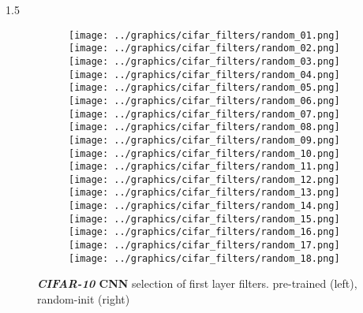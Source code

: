 \documentclass[final]{beamer}
\newlength{\onecolwid}
\newlength{\threecolwid}
\begin{document}
\begin{frame}[t]
\begin{columns}[t]
\begin{column}{\threecolwid}
\begin{alertblock}
\begin{columns}[t]
\begin{column}{1.5\onecolwid}
\begin{figure}
\begin{subfigure}{.4\linewidth}
					\centering
					\texttt{[image: ../graphics/cifar\_filters/random\_01.png]} 
					\texttt{[image: ../graphics/cifar\_filters/random\_02.png]} %
					\texttt{[image: ../graphics/cifar\_filters/random\_03.png]}
					\texttt{[image: ../graphics/cifar\_filters/random\_04.png]} %
					\texttt{[image: ../graphics/cifar\_filters/random\_05.png]} %
					\texttt{[image: ../graphics/cifar\_filters/random\_06.png]} \\
					\texttt{[image: ../graphics/cifar\_filters/random\_07.png]} %
					\texttt{[image: ../graphics/cifar\_filters/random\_08.png]} %
					\texttt{[image: ../graphics/cifar\_filters/random\_09.png]}
					\texttt{[image: ../graphics/cifar\_filters/random\_10.png]} 
					\texttt{[image: ../graphics/cifar\_filters/random\_11.png]} %
					\texttt{[image: ../graphics/cifar\_filters/random\_12.png]} \\
					\texttt{[image: ../graphics/cifar\_filters/random\_13.png]} %
					\texttt{[image: ../graphics/cifar\_filters/random\_14.png]} %
					\texttt{[image: ../graphics/cifar\_filters/random\_15.png]}
					\texttt{[image: ../graphics/cifar\_filters/random\_16.png]} %
					\texttt{[image: ../graphics/cifar\_filters/random\_17.png]} %
					\texttt{[image: ../graphics/cifar\_filters/random\_18.png]}
				\end{subfigure}

			\caption{\textbf{\emph{CIFAR-10} CNN} selection of first layer filters. pre-trained (left), random-init (right)}
			\label{fig:cifar_filters}


\end{figure}
\end{column}
\end{columns}
\end{alertblock}
\end{column}
\end{columns}
\end{frame}
\end{document}
